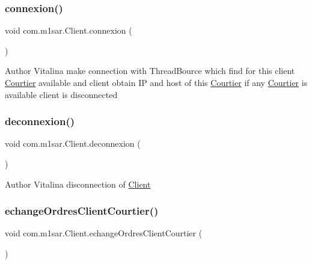 \subsubsection{\texorpdfstring{connexion()}{connexion()}}
{\footnotesize\ttfamily void com.\+m1sar.\+Client.\+connexion (\begin{DoxyParamCaption}{ }\end{DoxyParamCaption})}

\begin{DoxyAuthor}{Author}
Vitalina make connection with Thread\+Bource which find for this client \hyperlink{classcom_1_1m1sar_1_1_courtier}{Courtier} available and client obtain IP and host of this \hyperlink{classcom_1_1m1sar_1_1_courtier}{Courtier} if any \hyperlink{classcom_1_1m1sar_1_1_courtier}{Courtier} is available client is disconnected 
\end{DoxyAuthor}
\mbox{\label{classcom_1_1m1sar_1_1_client_adbad3a491bebe1acf093c0c6343ec507}} 
\subsubsection{\texorpdfstring{deconnexion()}{deconnexion()}}
{\footnotesize\ttfamily void com.\+m1sar.\+Client.\+deconnexion (\begin{DoxyParamCaption}{ }\end{DoxyParamCaption})}

\begin{DoxyAuthor}{Author}
Vitalina disconnection of \hyperlink{classcom_1_1m1sar_1_1_client}{Client} 
\end{DoxyAuthor}
\mbox{\label{classcom_1_1m1sar_1_1_client_a661a6a21b9891b99319d45fe1bb7c0c9}} 
\subsubsection{\texorpdfstring{echange\+Ordres\+Client\+Courtier()}{echangeOrdresClientCourtier()}}
{\footnotesize\ttfamily void com.\+m1sar.\+Client.\+echange\+Ordres\+Client\+Courtier (\begin{DoxyParamCaption}{ }\end{DoxyParamCaption})}

